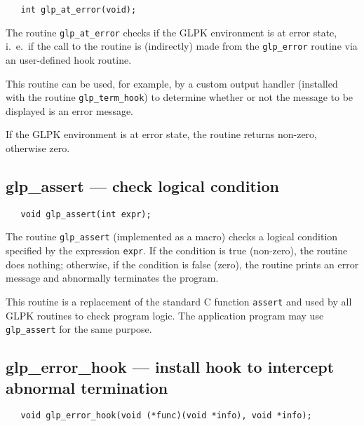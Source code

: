 \synopsis

\begin{verbatim}
   int glp_at_error(void);
\end{verbatim}

\description

The routine \verb|glp_at_error| checks if the GLPK environment is at
error state, i.~e.~if the call to the routine is (indirectly) made from
the \verb|glp_error| routine via an user-defined hook routine.

This routine can be used, for example, by a custom output handler
(installed with the routine \verb|glp_term_hook|) to determine whether
or not the message to be displayed is an error message.

\returns

If the GLPK environment is at error state, the routine returns
non-zero, otherwise zero.

\subsection{glp\_assert --- check logical condition}

\synopsis

\begin{verbatim}
   void glp_assert(int expr);
\end{verbatim}

\description

The routine \verb|glp_assert| (implemented as a macro) checks
a logical condition specified by the expression \verb|expr|. If the
condition is true (non-zero), the routine does nothing; otherwise, if
the condition is false (zero), the routine prints an error message and
abnormally terminates the program.

This routine is a replacement of the standard C function \verb|assert|
and used by all GLPK routines to check program logic. The application
program may use \verb|glp_assert| for the same purpose.

\subsection{glp\_error\_hook --- install hook to intercept abnormal
termination}

\synopsis

\begin{verbatim}
   void glp_error_hook(void (*func)(void *info), void *info);
\end{verbatim}

